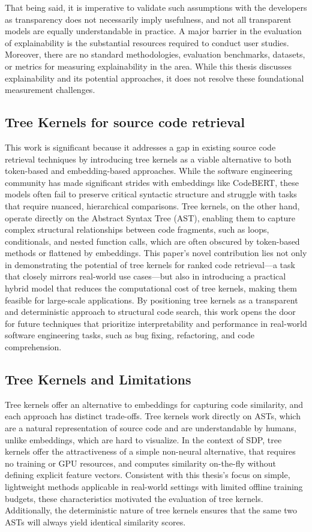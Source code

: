 \documentclass[\main/thesis.tex]{subfiles}
\begin{document}
That being said, it is imperative to validate such assumptions with the developers as transparency does not necessarily imply usefulness, and not all transparent models are equally understandable in practice. A major barrier in the evaluation of explainability is the substantial resources required to conduct user studies. 
Moreover, there are no standard methodologies, evaluation benchmarks, datasets, or metrics for measuring explainability in the area.
While this thesis discusses explainability and its potential approaches, it does not resolve these foundational measurement challenges. 

\subsection{Tree Kernels for source code retrieval}
This work is significant because it addresses a gap in existing source code retrieval techniques by introducing tree kernels as a viable alternative to both token-based and embedding-based approaches. While the software engineering community has made significant strides with embeddings like CodeBERT, these models often fail to preserve critical syntactic structure and struggle with tasks that require nuanced, hierarchical comparisons. Tree kernels, on the other hand, operate directly on the Abstract Syntax Tree (AST), enabling them to capture complex structural relationships between code fragments, such as loops, conditionals, and nested function calls, which are often obscured by token-based methods or flattened by embeddings. This paper’s novel contribution lies not only in demonstrating the potential of tree kernels for ranked code retrieval—a task that closely mirrors real-world use cases—but also in introducing a practical hybrid model that reduces the computational cost of tree kernels, making them feasible for large-scale applications. By positioning tree kernels as a transparent and deterministic approach to structural code search, this work opens the door for future techniques that prioritize interpretability and performance in real-world software engineering tasks, such as bug fixing, refactoring, and code comprehension.

\subsection{Tree Kernels and Limitations}

Tree kernels offer an alternative to embeddings for capturing code similarity, and each approach has distinct trade-offs. Tree kernels work directly on ASTs, which are a natural representation of source code and are understandable by humans, unlike embeddings, which are hard to visualize.
In the context of SDP, tree kernels offer the attractiveness of a simple non-neural alternative, that requires no training or GPU resources, and computes similarity on-the-fly without defining explicit feature vectors. 
Consistent with this thesis's focus on simple, lightweight methods applicable in real-world settings with limited offline training budgets, these characteristics motivated the evaluation of tree kernels.
Additionally, the deterministic nature of tree kernels ensures that the same two ASTs will always yield identical similarity scores.
\end{document}
